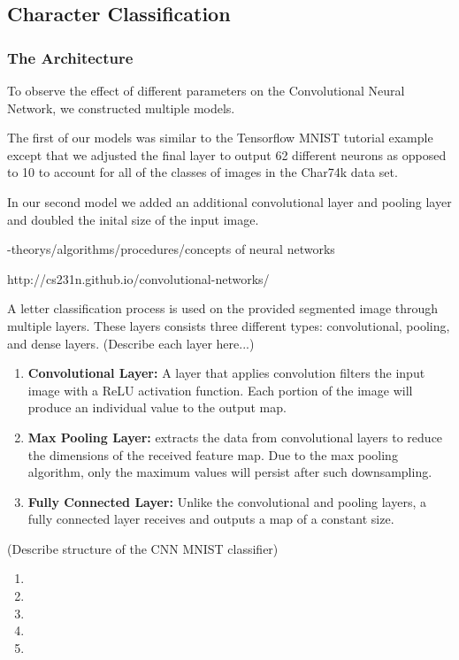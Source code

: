 \documentclass[11pt]{article}
\begin{document}
\subsection{Character Classification}

\subsubsection{The Architecture}
    To observe the effect of different parameters on the Convolutional Neural Network, we constructed multiple models.

    The first of our models was similar to the Tensorflow MNIST tutorial example except that we adjusted the final layer to output 62 different neurons as opposed to 10 to account for all of the classes of images in the Char74k data set.
    
    In our second model we added an additional convolutional layer and pooling layer and doubled the inital size of the input image.

-theorys/algorithms/procedures/concepts of neural networks

http://cs231n.github.io/convolutional-networks/

A letter classification process is used on the provided segmented image through multiple layers.  These layers consists three different types: convolutional, pooling, and dense layers. (Describe each layer here...)
\begin{enumerate}
  \item \textbf{Convolutional Layer:} A layer that applies convolution filters the input image with a ReLU activation function.  Each portion of the image will produce an individual value to the output map.
  \item \textbf{Max Pooling Layer:} extracts the data from convolutional layers to reduce the dimensions of the received feature map.  Due to the max pooling algorithm, only the maximum values will persist after such downsampling.  
  \item \textbf{Fully Connected Layer:} Unlike the convolutional and pooling layers, a fully connected layer receives and outputs a map of a constant size.
\end{enumerate}

(Describe structure of the CNN MNIST classifier)
\begin{enumerate}
  \item 
  \item 
  \item 
  \item 
  \item 
\end{enumerate}
\end{document}
